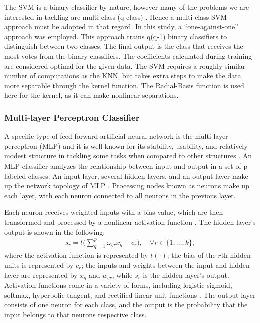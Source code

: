 The SVM is a binary classifier by nature, however many of the problems 
we are interested in tackling are multi-class (q-class) \cite{Oskoei08}.
 Hence a multi-class SVM approach must be adopted in that regard. 
In this study, a “one-against-one” approach \cite{Debnath2004} was employed. 
This approach trains q(q-1) binary classifiers to distinguish between two classes. 
The final output is the class that receives the most votes from 
the binary classifiers. 
The coefficients calculated during training are considered optimal for the given data. 
The SVM requires a roughly similar number of computations as the KNN, but takes extra steps to 
make the data more separable through the kernel function.
The Radial-Basis function is used here for the kernel, as it can make nonlinear separations.

\subsubsection{Multi-layer Perceptron Classifier}
A specific type of feed-forward artificial neural network is the multi-layer perceptron (MLP)
and it is well-known for its stability, usability, and relatively modest structure 
in tackling some tasks when compared to other structures \cite{yulita2018multi}. 
An MLP classifier analyzes the relationship between input and output 
in a set of p-labeled classes. An input layer, several hidden layers, and an output layer 
make up the network topology of MLP \cite{molina2021classification}. 
Processing nodes known as neurons make up each layer, 
with each neuron connected to all neurons in the previous layer. 

Each neuron receives weighted inputs with a bias value, which are then 
transformed and processed by a nonlinear activation function \cite{montesinos2022fundamentals}. 
The hidden layer's output is shown in the following:
\begin{align}
s_r = t \bigg( \sum_{q=1}^p \omega_{qr} x_q + c_r \bigg), \quad \forall r \in \{1, \ldots, k\},
\label{eq:layer}
\end{align}
where the activation function is represented by $t(\cdot)$; 
the bias of the $r$th hidden units is represented by $c_r$; 
the inputs and weights between the input and hidden layer are represented 
by $x_q$ and $w_{qr}$, while $s_r$ is the hidden layer's output. 
Activation functions come in a variety of forms, including logistic sigmoid, softmax, 
hyperbolic tangent, and rectified linear unit functions \cite{sharma2017activation}. 
The output layer consists of one neuron for each class, and the output is the
probability that the input belongs to that neurons respective class.

